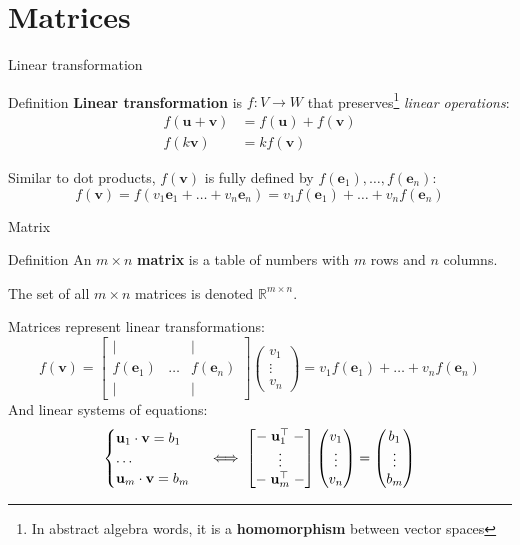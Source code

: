 \documentclass[10pt]{beamer}
\begin{document}
\section{Matrices}
\begin{frame}{Linear transformation}
    \begin{block}{Definition}
        \textbf{Linear transformation} is $f : V \to W$ that preserves\footnote{
        In abstract algebra words, it is a \textbf{homomorphism} between vector spaces} \textit{linear operations}:
        \begin{align*}
        f(\mathbf u + \mathbf v) &= f(\mathbf u) + f(\mathbf v) \\
        f(k \mathbf v) &= kf(\mathbf v)
        \end{align*}
    \end{block}
    Similar to dot products, $f(\mathbf v)$ is fully defined by $f(\mathbf e_1),\dots,f(\mathbf e_n)$:
    $$
    f(\mathbf v) = f(v_1 \mathbf e_1 + \dots + v_n \mathbf e_n) = v_1 f(\mathbf e_1) + \dots + v_n f(\mathbf e_n)
    $$
\end{frame}

\begin{frame}{Matrix}
    \begin{block}{Definition}
        An $m \times n$ \textbf{matrix} is a table of numbers with $m$ rows and $n$ columns.

        The set of all $m \times n$ matrices is denoted $\mathbb R^{m \times n}$.
    \end{block}
    Matrices represent linear transformations:
    $$
    f(\mathbf v) = \begin{bmatrix}
        | &   & | \\
        f(\mathbf e_1) & \dots & f(\mathbf e_n) \\
        | &   & |
    \end{bmatrix} \begin{pmatrix}
        v_1 \\ \vdots \\ v_n
    \end{pmatrix} = v_1 f(\mathbf e_1) + \dots + v_n f(\mathbf e_n)
    $$
    And linear systems of equations:
    $$\begin{cases}
        \mathbf u_1 \cdot \mathbf v = b_1 \\ \dots \\ \mathbf u_m \cdot \mathbf v = b_m
    \end{cases} \iff
    \begin{bmatrix}
        \relbar\mathbf  u_1^\top\relbar \\
        \vdots \\
        \relbar\mathbf u_m^\top\relbar
    \end{bmatrix}
    \begin{pmatrix}v_1 \\ \vdots \\ v_n\end{pmatrix}= \begin{pmatrix}b_1 \\ \vdots \\ b_m\end{pmatrix}
    $$
\end{frame}
\end{document}
